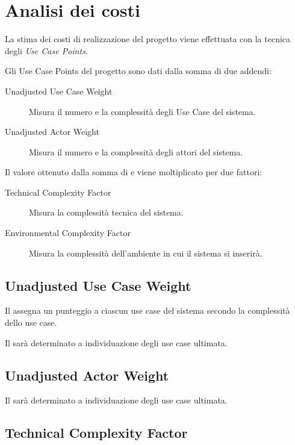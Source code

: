 \section{Analisi dei costi}


La stima dei costi di realizzazione del progetto viene effettuata con la tecnica degli \emph{Use Case Points}.

Gli Use Case Points del progetto sono dati dalla somma di due addendi:
\begin{description}
	\item[Unadjusted Use Case Weight]
		Misura il numero e la complessit\`a degli Use Case del sistema.
	\item[Unadjusted Actor Weight]
		Misura il numero e la complessit\`a degli attori del sistema.
\end{description}
Il valore ottenuto dalla somma di  e  viene moltiplicato per due fattori:
\begin{description}
	\item[Technical Complexity Factor]
		Misura la complessit\`a tecnica del sistema.
	\item[Environmental Complexity Factor]
		Misura la complessit\`a dell'ambiente in cui il sistema si inserir\`a.
\end{description}

\subsection{Unadjusted Use Case Weight}

Il  assegna un punteggio a ciascun use case del sistema secondo la complessit\`a dello use case.

Il  sar\`a determinato a individuazione degli use case ultimata.

\subsection{Unadjusted Actor Weight}

Il  sar\`a determinato a individuazione degli use case ultimata.

\subsection{Technical Complexity Factor}

